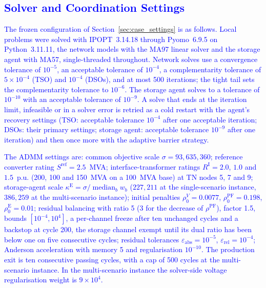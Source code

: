 \documentclass[preprint,12pt]{elsarticle}
\begin{document}
\subsection{\textcolor{blue}{Solver and Coordination Settings}}
\label{app:admm_updated_settings}

\textcolor{blue}{
    The frozen configuration of Section~\ref{sec:case_settings} is as follows.
    Local problems were solved with IPOPT~3.14.18 through Pyomo~6.9.5 on Python~3.11.11, the network models with the MA97 linear solver and the storage agent with MA57, single-threaded throughout. Network solves use a convergence tolerance of $10^{-5}$, an acceptable tolerance of $10^{-4}$, a complementarity tolerance of $5 \times 10^{-4}$ (TSO) and $10^{-4}$ (DSOs), and at most 500 iterations; the tight tail sets the complementarity tolerance to $10^{-6}$. The storage agent solves to a tolerance of $10^{-10}$ with an acceptable tolerance of $10^{-9}$. A solve that ends at the iteration limit, infeasible or in a solver error is retried as a cold restart with the agent's recovery settings (TSO: acceptable tolerance $10^{-4}$ after one acceptable iteration; DSOs: their primary settings; storage agent: acceptable tolerance $10^{-9}$ after one iteration) and then once more with the adaptive barrier strategy.
}

\textcolor{blue}{
    The ADMM settings are: common objective scale $\sigma = 93{,}635{,}360$; reference converter rating $S^{\text{ref}} = 2.5$~MVA; interface-transformer ratings $R^{\text{I}} = 2.0$, $1.0$ and $1.5$~p.u. (200, 100 and 150~MVA on a 100~MVA base) at TN nodes 5, 7 and 9; storage-agent scale $\kappa^{\text{E}} = \sigma/\operatorname{median}_b w_b$ ($227{,}211$ at the single-scenario instance, $386{,}259$ at the multi-scenario instance); initial penalties $\rho^{V}_0 = 0.0077$, $\rho^{\text{PF}}_0 = 0.198$, $\rho^{\text{E}}_0 = 0.01$; residual balancing with ratio 5 (3 for the decrease of $\rho^{\text{PF}}$), factor 1.5, bounds $[10^{-4}, 10^{4}]$, a per-channel freeze after ten unchanged cycles and a backstop at cycle 200, the storage channel exempt until its dual ratio has been below one on five consecutive cycles; residual tolerances $\varepsilon_{\text{abs}} = 10^{-5}$, $\varepsilon_{\text{rel}} = 10^{-4}$; Anderson acceleration with memory 5 and regularisation $10^{-10}$. The production exit is ten consecutive passing cycles, with a cap of 500 cycles at the multi-scenario instance. 
    In the multi-scenario instance the solver-side voltage regularisation weight is $9 \times 10^{4}$.
}
\end{document}
